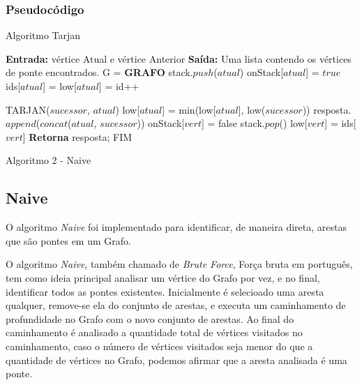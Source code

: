 \subsubsection{Pseudocódigo}
\begin{center}	
	\vspace{-0.3cm}
\begin{minipage}[ht]{13cm}
\begin{algorithm}[H]
  \footnotesize
  \caption{Algoritmo Tarjan}
  \label{alg:2}
  \begin{algorithmic}[2]
     \STATE \textbf{Entrada:} vértice Atual e vértice Anterior
     \STATE \textbf{Saída:} Uma lista contendo os vértices de ponte encontrados.
     \STATE G = \textbf{GRAFO}
     \STATE stack.$push$($atual$)
     \STATE onStack[$atual$] = $true$
     \STATE ids[$atual$] = low[$atual$] = id++
     
            \STATE TARJAN($sucessor$, $atual$)
        \ENDIF
            \STATE low[$atual$] = min(low[$atual$], low($sucessor$))
        \ENDIF
            \STATE resposta.$append$($concat$($atual$, $sucessor$))
        \ENDIF
    \ENDFOR
            \STATE onStack[$vert$] = false
            \STATE stack.$pop$()
            \STATE low[$vert$] = ids[$vert$]
                \STATE {}
            \ENDIF
        \ENDFOR
    \ENDIF
    \STATE \textbf{Retorna} resposta; FIM
  \end{algorithmic}
\end{algorithm}
\caption{Algoritmo 2 - Naive}
\end{minipage}
\end{center}

\subsection{Naive}

O algoritmo \textit{Naive} foi implementado para identificar, de maneira direta, arestas que são pontes em um Grafo.

O algoritmo \textit{Naive}, também chamado de \textit{Brute Force}, Força bruta em português, tem como ideia principal analisar um vértice do Grafo por vez, e no final, identificar todos as pontes existentes. Inicialmente é selecioado uma aresta qualquer, remove-se ela do conjunto de arestas, e executa um caminhamento de profundidade no Grafo com o novo conjunto de arestas. Ao final do caminhamento é analisado a quantidade total de vértices visitados no caminhamento, caso o número de vértices visitados seja menor do que a quantidade de vértices no Grafo, podemos afirmar que a aresta analisada é uma ponte.
